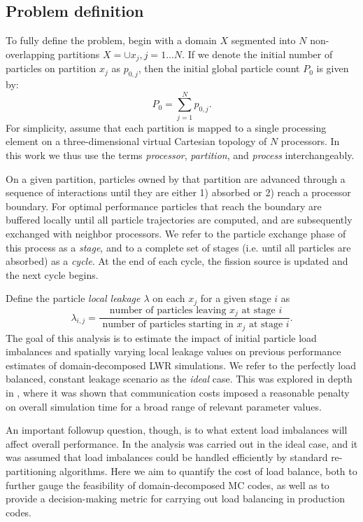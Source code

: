 \subsection{Problem definition}
\label{sec:definition}

To fully define the problem, begin with a domain $X$ segmented into $N$
non-overlapping partitions $X = \cup x_j, j=1...N$. If we denote the initial
number of particles on partition $x_j$ as $p_{0,j}$, then the initial global
particle count $P_0$ is given by:
\begin{equation}
  \label{eq:globalP}
  P_0 = \sum_{j=1}^{N} p_{0,j}.
\end{equation}
For simplicity, assume that each partition is mapped to a single processing
element on a three-dimensional virtual Cartesian topology of $N$ processors. In
this work we thus use the terms \emph{processor}, \emph{partition}, and
\emph{process} interchangeably.

On a given partition, particles owned by that partition are advanced through a
sequence of interactions until they are either 1) absorbed or 2) reach a
processor boundary. For optimal performance particles that reach the boundary
are buffered locally until all particle trajectories are computed, and are
subsequently exchanged with neighbor processors. We refer to the particle
exchange phase of this process as a \emph{stage}, and to a complete set of
stages (i.e. until all particles are absorbed) as a \emph{cycle}. At the end of
each cycle, the fission source is updated and the next cycle begins.

Define the particle {\it local leakage $\lambda$} on each $x_j$ for a given
stage $i$ as
\begin{equation*}
  \lambda_{i,j} = \frac{\mbox{ number of particles leaving $x_j$ at stage
      $i$}}{\mbox{ number of particles starting in $x_j$ at stage $i$}}.
\end{equation*}
The goal of this analysis is to estimate the impact of initial particle load
imbalances and spatially varying local leakage values on previous performance
estimates of domain-decomposed LWR simulations.  We refer to the perfectly load
balanced, constant leakage scenario as the \emph{ideal} case. This was explored
in depth in \cite{jcp-siegel-2012-1}, where it was shown that communication
costs imposed a reasonable penalty on overall simulation time for a broad range
of relevant parameter values.

An important followup question, though, is to what extent load imbalances will
affect overall performance. In \cite{jcp-siegel-2012-1} the analysis was carried
out in the ideal case, and it was assumed that load imbalances could be handled
efficiently by standard re-partitioning algorithms. Here we aim to quantify the
cost of load balance, both to further gauge the feasibility of domain-decomposed
MC codes, as well as to provide a decision-making metric for carrying out load
balancing in production codes.

